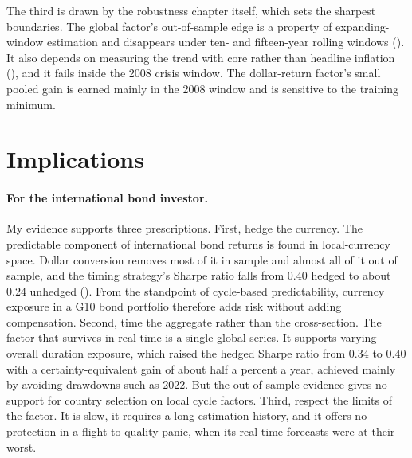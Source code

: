 \bigskip
The third is drawn by the robustness
chapter itself, which sets the sharpest boundaries. The global factor's
out-of-sample edge is a property of expanding-window estimation and
disappears under ten- and fifteen-year rolling windows
(). It also depends on measuring
the trend with core rather than headline inflation
(), and it fails inside the 2008 crisis window.
The dollar-return factor's small pooled gain is earned mainly in the 2008
window and is sensitive to the training minimum. 

\section{Implications}
\label{sec:disc-implications}

\paragraph{For the international bond investor.} My evidence supports three
prescriptions. First, hedge
the currency. The predictable component of international bond
returns is found in local-currency space. Dollar conversion removes most
of it in sample and almost all of it out of sample, and the
timing strategy's Sharpe ratio falls from $0.40$ hedged to about $0.24$
unhedged (). From the standpoint of cycle-based
predictability, currency exposure in a G10 bond portfolio therefore adds
risk without adding compensation. Second, time the
aggregate rather than the cross-section. The factor that survives in real
time is a single global series. It supports varying overall duration
exposure, which raised the hedged Sharpe ratio from $0.34$ to $0.40$ with
a certainty-equivalent gain of about half a percent a year, achieved mainly
by avoiding drawdowns such as 2022. But the out-of-sample evidence
gives no support for country selection on local cycle factors. Third, respect
the limits of the factor. It is slow, it requires a long
estimation history, and it offers no protection in a flight-to-quality
panic, when its real-time forecasts were at their worst.

